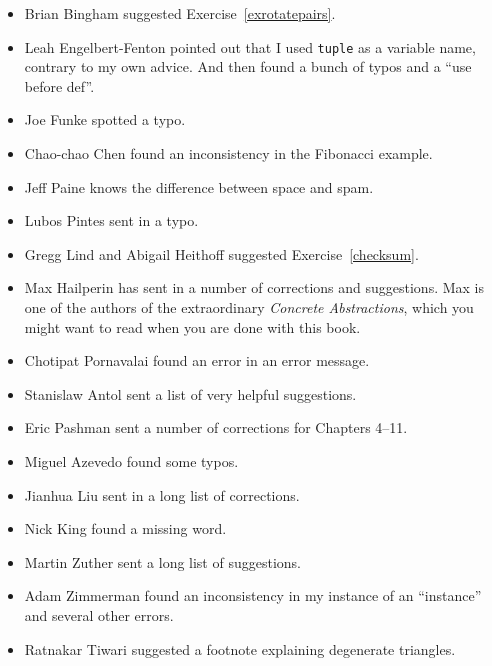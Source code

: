 \documentclass[10pt]{book}
\begin{document}
\begin{itemize}
\item Brian Bingham suggested Exercise~\ref{exrotatepairs}.

\item Leah Engelbert-Fenton pointed out that I used {\tt tuple}
as a variable name, contrary to my own advice.  And then found
a bunch of typos and a ``use before def''.

\item Joe Funke spotted a typo.

\item Chao-chao Chen found an inconsistency in the Fibonacci example.

\item Jeff Paine knows the difference between space and spam.

\item Lubos Pintes sent in a typo.

\item Gregg Lind and Abigail Heithoff suggested Exercise~\ref{checksum}.

\item Max Hailperin has sent in a number of corrections and
  suggestions.  Max is one of the authors of the extraordinary {\em
    Concrete Abstractions}, which you might want to read when you are
  done with this book.

\item Chotipat Pornavalai found an error in an error message.

\item Stanislaw Antol sent a list of very helpful suggestions.

\item Eric Pashman sent a number of corrections for Chapters 4--11.

\item Miguel Azevedo found some typos.

\item Jianhua Liu sent in a long list of corrections.

\item Nick King found a missing word.

\item Martin Zuther sent a long list of suggestions.

\item Adam Zimmerman found an inconsistency in my instance
of an ``instance'' and several other errors.

\item Ratnakar Tiwari suggested a footnote explaining degenerate
triangles.


\end{itemize}
\end{document}
